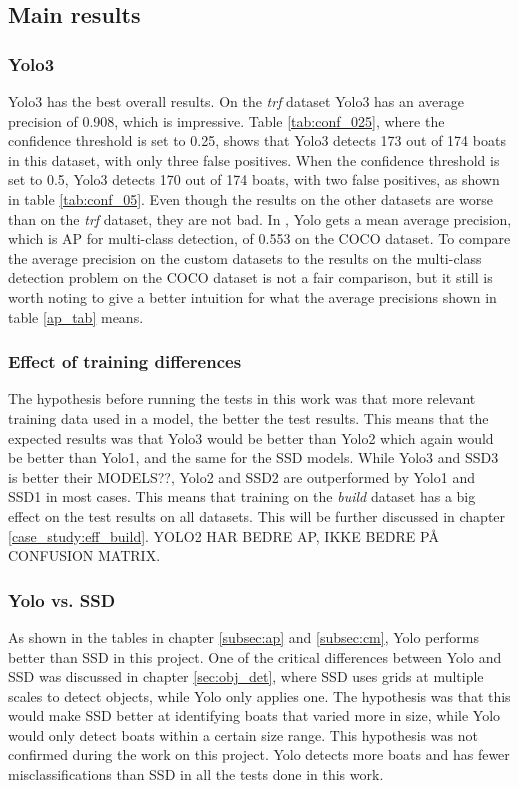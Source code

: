 \vspace{3mm}


\subsection{Main results}
\label{subsec:main}

\subsubsection{Yolo3}
Yolo3 has the best overall results. On the \textit{trf} dataset Yolo3 has an average precision of 0.908, which is impressive. Table \ref{tab:conf_025}, where the confidence threshold is set to 0.25, shows that Yolo3 detects 173 out of 174 boats in this dataset, with only three false positives. When the confidence threshold is set to 0.5, Yolo3 detects 170 out of 174 boats, with two false positives, as shown in table \ref{tab:conf_05}. Even though the results on the other datasets are worse than on the \textit{trf} dataset, they are not bad. In \citep{YOLOv3}, Yolo gets a mean average precision, which is AP for multi-class detection, of 0.553 on the COCO dataset. To compare the average precision on the custom datasets to the results on the multi-class detection problem on the COCO dataset is not a fair comparison, but it still is worth noting to give a better intuition for what the average precisions shown in table \ref{ap_tab} means. 

\subsubsection{Effect of training differences}
The hypothesis before running the tests in this work was that more relevant training data used in a model, the better the test results. This means that the expected results was that Yolo3 would be better than Yolo2 which again would be better than Yolo1, and the same for the SSD models. While Yolo3 and SSD3 is better their MODELS??,  Yolo2 and SSD2 are outperformed by Yolo1 and SSD1 in most cases. This means that training on the \textit{build} dataset has a big effect on the test results on all datasets. This will be further discussed in chapter \ref{case_study:eff_build}.  YOLO2 HAR BEDRE AP, IKKE BEDRE PÅ CONFUSION MATRIX.

\subsubsection{Yolo vs. SSD}
As shown in the tables in chapter \ref{subsec:ap} and \ref{subsec:cm}, Yolo performs better than SSD in this project. One of the critical differences between Yolo and SSD was discussed in chapter \ref{sec:obj_det}, where SSD uses grids at multiple scales to detect objects, while Yolo only applies one. The hypothesis was that this would make SSD better at identifying boats that varied more in size, while Yolo would only detect boats within a certain size range. This hypothesis was not confirmed during the work on this project. Yolo detects more boats and has fewer misclassifications than SSD in all the tests done in this work.

